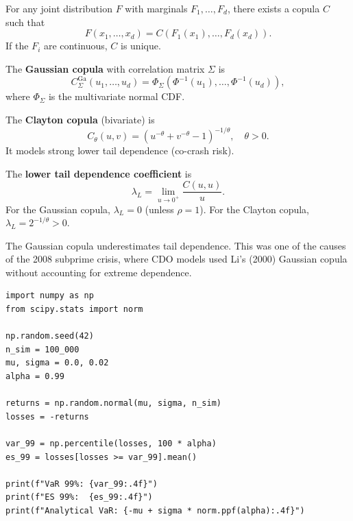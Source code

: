 \begin{theorem}[Sklar, 1959]
For any joint distribution $F$ with marginals $F_1, \ldots, F_d$, there
exists a copula $C$ such that
\[
    F(x_1, \ldots, x_d) = C(F_1(x_1), \ldots, F_d(x_d)).
\]
If the $F_i$ are continuous, $C$ is unique.
\end{theorem}

\begin{example}
The \textbf{Gaussian copula} with correlation matrix $\Sigma$ is
\[
    C_\Sigma^{\mathrm{Ga}}(u_1, \ldots, u_d)
    = \Phi_\Sigma(\Phi^{-1}(u_1), \ldots, \Phi^{-1}(u_d)),
\]
where $\Phi_\Sigma$ is the multivariate normal CDF.
\end{example}

\begin{definition}
The \textbf{Clayton copula} (bivariate) is
\[
    C_\theta(u, v) = (u^{-\theta} + v^{-\theta} - 1)^{-1/\theta},
    \quad \theta > 0.
\]
It models strong lower tail dependence (co-crash risk).
\end{definition}

\begin{definition}
The \textbf{lower tail dependence coefficient} is
\[
    \lambda_L = \lim_{u \to 0^+} \frac{C(u, u)}{u}.
\]
For the Gaussian copula, $\lambda_L = 0$ (unless $\rho = 1$). For the Clayton
copula, $\lambda_L = 2^{-1/\theta} > 0$.
\end{definition}

\begin{remark}
The Gaussian copula underestimates tail dependence. This was one of the causes
of the 2008 subprime crisis, where CDO models used Li's (2000) Gaussian copula
without accounting for extreme dependence.
\end{remark}

\begin{codeblock}[title=\textbf{VaR and ES computation via Monte Carlo}]
\begin{verbatim}
import numpy as np
from scipy.stats import norm

np.random.seed(42)
n_sim = 100_000
mu, sigma = 0.0, 0.02
alpha = 0.99

returns = np.random.normal(mu, sigma, n_sim)
losses = -returns

var_99 = np.percentile(losses, 100 * alpha)
es_99 = losses[losses >= var_99].mean()

print(f"VaR 99%: {var_99:.4f}")
print(f"ES 99%:  {es_99:.4f}")
print(f"Analytical VaR: {-mu + sigma * norm.ppf(alpha):.4f}")
\end{verbatim}
\end{codeblock}

